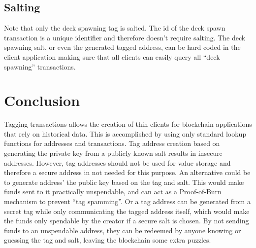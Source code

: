 \documentclass[a4paper,10pt]{article}
\begin{document}
\subsection{Salting}
Note that only the deck spawning tag is salted. The id of the deck spawn transaction is a unique identifier and therefore doesn't require salting.
The deck spawning salt, or even the generated tagged address, can be hard coded in the client application making sure that all clients can easily query all ``deck spawning'' transactions.


\section{Conclusion}
Tagging transactions allows the creation of thin clients for blockchain applications that rely on historical data.
This is accomplished by using only standard lookup functions for addresses and transactions.
Tag address creation based on generating the private key from a publicly known salt results in insecure addresses.
However, tag addresses should not be used for value storage and therefore a secure address in not needed for this purpose.
An alternative could be to generate address' the public key based on the tag and salt. This would make funds sent to it practically unspendable, and can act as a Proof-of-Burn mechanism to prevent ``tag spamming''.
Or a tag address can be generated from a secret tag while only communicating the tagged address itself, which would make the funds only spendable by the creator if a secure salt is chosen.
By not sending funds to an unspendable address, they can be redeemed by anyone knowing or guessing the tag and salt, leaving the blockchain some extra puzzles.
\end{document}
